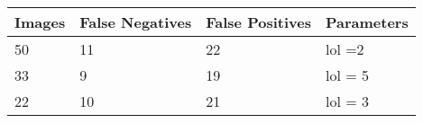 \begin{center}
    \begin{tabular}{ | l | l | l | p{5cm} |}
    \hline
    Images & False Negatives & False Positives & Parameters \\ \hline
    50 & 11 & 22 & lol =2 \\ \hline
    33 & 9 & 19 & lol = 5 \\ \hline
    22 & 10 & 21 & lol = 3 \\
    \hline
    \end{tabular}
\end{center}